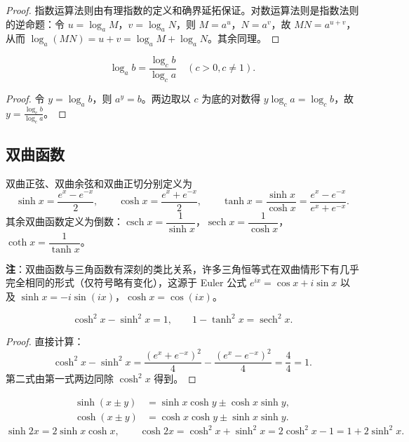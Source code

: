 \begin{proof}
	指数运算法则由有理指数的定义和确界延拓保证。对数运算法则是指数法则的逆命题：令 $u = \log_a M$，$v = \log_a N$，则 $M = a^u$，$N = a^v$，故 $MN = a^{u+v}$，从而 $\log_a(MN) = u+v = \log_a M + \log_a N$。其余同理。
\end{proof}

\begin{proposition}[换底公式]
	\[
	\log_a b = \frac{\log_c b}{\log_c a} \quad (c>0, c \neq 1).
	\]
\end{proposition}

\begin{proof}
	令 $y = \log_a b$，则 $a^y = b$。两边取以 $c$ 为底的对数得 $y \log_c a = \log_c b$，故 $y = \frac{\log_c b}{\log_c a}$。
\end{proof}



\subsection*{双曲函数}

\begin{definition}
	双曲正弦、双曲余弦和双曲正切分别定义为
	\[
	\sinh x = \frac{e^x - e^{-x}}{2}, \qquad
	\cosh x = \frac{e^x + e^{-x}}{2}, \qquad
	\tanh x = \frac{\sinh x}{\cosh x} = \frac{e^x - e^{-x}}{e^x + e^{-x}}.
	\]
	其余双曲函数定义为倒数：$\operatorname{csch} x = \dfrac{1}{\sinh x}$，$\operatorname{sech} x = \dfrac{1}{\cosh x}$，$\operatorname{coth} x = \dfrac{1}{\tanh x}$。
\end{definition}
\textbf{注}：双曲函数与三角函数有深刻的类比关系，许多三角恒等式在双曲情形下有几乎完全相同的形式（仅符号略有变化），这源于 Euler 公式 $e^{ix} = \cos x + i\sin x$ 以及 $\sinh x = -i\sin(ix)$，$\cosh x = \cos(ix)$。


\begin{proposition}[基本恒等式]
	\[
	\cosh^2 x - \sinh^2 x = 1, \qquad
	1 - \tanh^2 x = \operatorname{sech}^2 x.
	\]
\end{proposition}

\begin{proof}
	直接计算：
	\[
	\cosh^2 x - \sinh^2 x = \frac{(e^x+e^{-x})^2}{4} - \frac{(e^x-e^{-x})^2}{4} = \frac{4}{4} = 1.
	\]
	第二式由第一式两边同除 $\cosh^2 x$ 得到。
\end{proof}

\begin{proposition}[和差公式与倍角公式]
	\begin{align*}
		\sinh(x \pm y) &= \sinh x \cosh y \pm \cosh x \sinh y, \\
		\cosh(x \pm y) &= \cosh x \cosh y \pm \sinh x \sinh y.
	\end{align*}
	\[
	\sinh 2x = 2\sinh x \cosh x, \qquad
	\cosh 2x = \cosh^2 x + \sinh^2 x = 2\cosh^2 x - 1 = 1 + 2\sinh^2 x.
	\]
\end{proposition}

